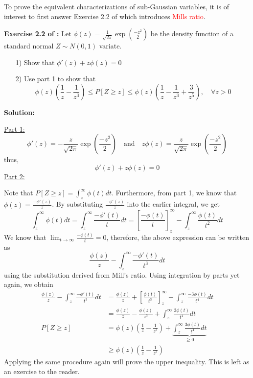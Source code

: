 \documentclass[10pt,handout,english]{beamer}
\newcommand{\1}{\mathbbm{1}}
\begin{document}
\begin{frame}[allowframebreaks]
To prove the equivalent characterizations of sub-Gaussian variables, it is of interest to first answer Exercise 2.2 of \citet{wainwright2019high} which introduces \textcolor{red}{Mills ratio}.

\textbf{Exercise 2.2 of \citet{wainwright2019high}:} Let $\phi(z)=\frac{1}{\sqrt{2\pi}}\exp\left(\frac{-z^2}{2}\right)$ be the density function of a standard normal $Z\sim N(0,1)$ variate.
\begin{itemize}
\item[1)]Show that $\phi'(z)+z\phi(z)=0$
\item[2)] Use part 1 to show that
\[
\phi(z)\left(\frac{1}{z}-\frac{1}{z^3}\right)\leq P[Z\geq z]\leq\phi(z)\left(\frac{1}{z}-\frac{1}{z^3}+\frac{3}{z^5}\right),\quad \forall z>0
\]
\end{itemize}
\textbf{Solution:}

\underline{Part 1:}
\[
\phi'(z)=-\frac{z}{\sqrt{2\pi}}\exp\left(\frac{-z^2}{2}\right)\quad \text{and}\quad z\phi(z)=\frac{z}{\sqrt{2\pi}}\exp\left(\frac{-z^2}{2}\right) 
\]
thus,
\[
\phi'(z)+z\phi(z)=0
\]
\underline{Part 2:} 

Note that $P[Z\geq z]=\int_{z}^{\infty}\phi(t)dt$. Furthermore, from part 1, we know that $\phi(z)=\frac{-\phi'(z)}{z}$. By substituting $\frac{-\phi'(z)}{z}$ into the earlier integral, we get
\[
\int_{z}^{\infty}\phi(t)dt=\int_{z}^{\infty}\frac{-\phi'(t)}{t}dt=\left[\frac{-\phi(t)}{t}\right]_{z}^{\infty}-\int_{z}^{\infty} \frac{\phi(t)}{t^2}dt
\]
We know that $\lim_{t\to \infty}\frac{-\phi(t)}{t}=0$, therefore, the above expression can be written as
\[
\frac{\phi(z)}{z}-\int_{z}^{\infty} \frac{-\phi'(t)}{t^3}dt
\] 
using the substitution derived from Mill's ratio. Using integration by parts yet again, we obtain
\begin{align*}
\frac{\phi(z)}{z}-\int_{z}^{\infty} \frac{-\phi'(t)}{t^3}dt&=\frac{\phi(z)}{z}+\left[\frac{\phi(t)}{t^3}\right]_{z}^{\infty}-\int_{z}^{\infty}\frac{-3\phi(t)}{t^4}dt\\
&=\frac{\phi(z)}{z}-\frac{\phi(z)}{z^3}+\int_{z}^{\infty}\frac{3\phi(t)}{t^4}dt\\
P[Z\geq z]&=\phi(z)\left(\frac{1}{z}-\frac{1}{z^3}\right)+\underbrace{\int_{z}^{\infty}\frac{3\phi(t)}{t^4}dt}_{\geq0}\\
		&\geq \phi(z)\left(\frac{1}{z}-\frac{1}{z^3}\right)
\end{align*}
Applying the same procedure again will prove the upper inequality. This is left as an exercise to the reader.
\end{frame}
\end{document}
